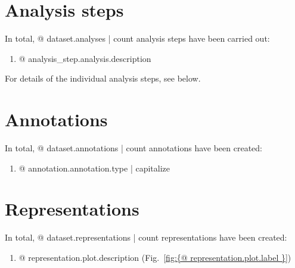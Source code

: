 \section{Analysis steps}

In total, {@ dataset.analyses | count } analysis steps have been carried out:

\begin{enumerate}
\item {@ analysis_step.analysis.description }
\end{enumerate}

For details of the individual analysis steps, see below.




\section{Annotations}

In total, {@ dataset.annotations | count } annotations have been created:

\begin{enumerate}
\item {@ annotation.annotation.type | capitalize }
\end{enumerate}





\section{Representations}

In total, {@ dataset.representations | count } representations have been created:

\begin{enumerate}
\item {@ representation.plot.description } (Fig.~\ref{fig:{@ representation.plot.label }})
\end{enumerate}

